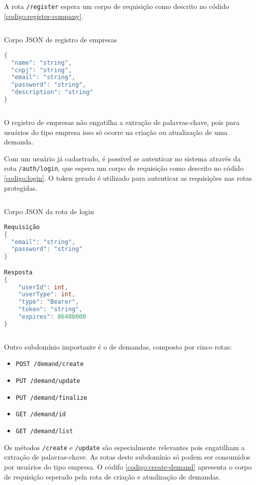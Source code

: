 A rota \texttt{/register} espera um corpo de requisição como descrito no códido \ref{codigo:register-company}.

\begin{sourcecode}[H]
  \caption{\label{codigo:register-company}Corpo JSON de registro de empresas}
  \begin{lstlisting}[frame=single, language=Java]
{
  "name": "string",
  "cnpj": "string",
  "email": "string",
  "password": "string",
  "description": "string"
}
\end{lstlisting}
  \fonte{}
\end{sourcecode}

O registro de empresas não engatilha a extração de palavras-chave, pois para usuários do tipo empresa isso só ocorre na criação ou atualização de uma demanda.

Com um usuário já cadastrado, é possível se autenticar no sistema através da rota \texttt{/auth/login}, que espera um corpo de requisição como descrito no códido \ref{codigo:login}. O token gerado é utilizado para autenticar as requisições nas rotas protegidas.

\begin{sourcecode}[H]
  \caption{\label{codigo:login}Corpo JSON da rota de login}
  \begin{lstlisting}[frame=single, language=Java]
Requisição
{
  "email": "string",
  "password": "string"
}

Resposta
{
	"userId": int,
	"userType": int,
	"type": "Bearer",
	"token": "string",
	"expires": 86400000
}
\end{lstlisting}
  \fonte{}
\end{sourcecode}

Outro subdomínio importante é o de demandas, composto por cinco rotas:

\begin{itemize}
  \item \texttt{POST /demand/create}
  \item \texttt{PUT /demand/update}
  \item \texttt{PUT /demand/finalize}
  \item \texttt{GET /demand/{id}}
  \item \texttt{GET /demand/list}
\end{itemize}

Os métodos \texttt{/create} e \texttt{/update} são especialmente relevantes pois engatilham a extração de palavras-chave. As rotas deste subdomínio só podem ser consumidos por usuários do tipo empresa. O códifo \ref{codigo:create-demand} apresenta o corpo de requisição esperado pela rota de criação e atualização de demandas.

